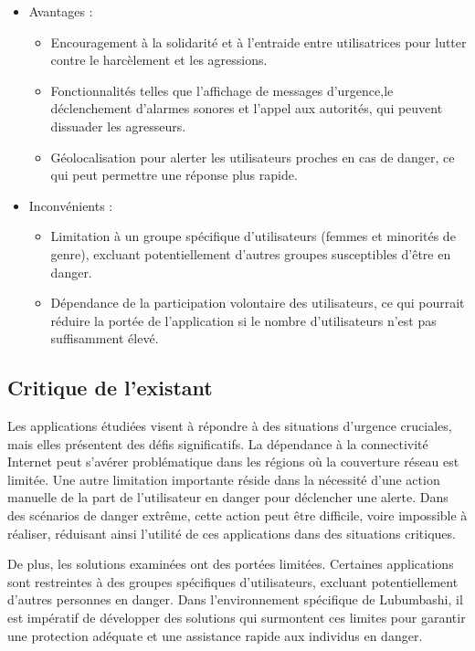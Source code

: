 \begin{itemize}
	\item Avantages :
	\begin{itemize}
		\item Encouragement à la solidarité et à l'entraide entre utilisatrices pour lutter contre le harcèlement et les agressions.
		\item Fonctionnalités telles que l'affichage de messages d'urgence,le déclenchement d'alarmes sonores et l'appel aux autorités, qui peuvent dissuader les agresseurs.
		\item Géolocalisation pour alerter les utilisateurs proches en cas de danger, ce qui peut permettre une réponse plus rapide.
	\end{itemize}
	
	\item Inconvénients :
	\begin{itemize}
		\item Limitation à un groupe spécifique d'utilisateurs (femmes et minorités de genre), excluant potentiellement d'autres groupes susceptibles d'être en danger.
		
		\item Dépendance de la participation volontaire des utilisateurs, ce qui pourrait réduire la portée de l'application si le nombre d'utilisateurs n'est pas suffisamment élevé.
	\end{itemize}
	
\end{itemize}

\subsection{Critique de l’existant}

Les applications étudiées visent à répondre à des situations d'urgence cruciales, mais elles présentent des défis significatifs. La dépendance à la connectivité Internet peut s'avérer problématique dans les régions où la couverture réseau est limitée. Une autre limitation importante réside dans la nécessité d'une action manuelle de la part de l'utilisateur en danger pour déclencher une alerte. Dans des scénarios de danger extrême, cette action peut être difficile, voire impossible à réaliser, réduisant ainsi l'utilité de ces applications dans des situations critiques.

De plus, les solutions examinées ont des portées limitées. Certaines applications sont restreintes à des groupes spécifiques d'utilisateurs, excluant potentiellement d'autres personnes en danger.
Dans l'environnement spécifique de Lubumbashi, il est impératif de développer des solutions qui surmontent ces limites pour garantir une protection adéquate et une assistance rapide aux individus en danger.

